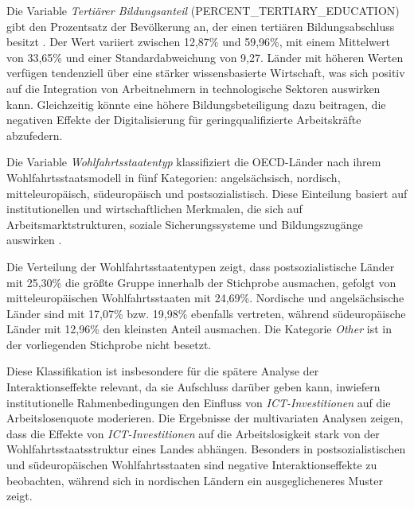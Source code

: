 Die Variable \textit{Tertiärer Bildungsanteil} (PERCENT\_TERTIARY\_EDUCATION) gibt 
den Prozentsatz der Bevölkerung an, der einen tertiären Bildungsabschluss besitzt 
\parencite{oecd2022education}. Der Wert variiert zwischen 12,87\% und 59,96\%, mit einem 
Mittelwert von 33,65\% und einer Standardabweichung von 9,27. Länder mit höheren Werten 
verfügen tendenziell über eine stärker wissensbasierte Wirtschaft, was sich positiv auf die 
Integration von Arbeitnehmern in technologische Sektoren auswirken kann. Gleichzeitig könnte 
eine höhere Bildungsbeteiligung dazu beitragen, die negativen Effekte der Digitalisierung für 
geringqualifizierte Arbeitskräfte abzufedern.



Die Variable \textit{Wohlfahrtsstaatentyp} klassifiziert die OECD-Länder nach ihrem 
Wohlfahrtsstaatsmodell in fünf Kategorien: angelsächsisch, nordisch, mitteleuropäisch, 
südeuropäisch und postsozialistisch. Diese Einteilung basiert auf institutionellen und 
wirtschaftlichen Merkmalen, die sich auf Arbeitsmarktstrukturen, soziale Sicherungssysteme 
und Bildungszugänge auswirken \parencite[vgl.][S. 56]{espingandersen1990thethree}.

Die Verteilung der Wohlfahrtsstaatentypen zeigt, dass postsozialistische Länder mit 
25,30\% die größte Gruppe innerhalb der Stichprobe ausmachen, gefolgt von 
mitteleuropäischen Wohlfahrtsstaaten mit 24,69\%. Nordische und angelsächsische 
Länder sind mit 17,07\% bzw. 19,98\% ebenfalls vertreten, während südeuropäische 
Länder mit 12,96\% den kleinsten Anteil ausmachen. Die Kategorie \textit{Other} ist 
in der vorliegenden Stichprobe nicht besetzt.

Diese Klassifikation ist insbesondere für die spätere Analyse der Interaktionseffekte 
relevant, da sie Aufschluss darüber geben kann, inwiefern institutionelle 
Rahmenbedingungen den Einfluss von \textit{\ac{ICT}-Investitionen} auf die Arbeitslosenquote 
moderieren. Die Ergebnisse der multivariaten Analysen zeigen, dass die Effekte von 
\textit{\ac{ICT}-Investitionen} auf die Arbeitslosigkeit stark von der Wohlfahrtsstaatsstruktur 
eines Landes abhängen.  Besonders in postsozialistischen und südeuropäischen Wohlfahrtsstaaten 
sind negative Interaktionseffekte zu beobachten, während sich in nordischen Ländern ein 
ausgeglicheneres Muster zeigt.

